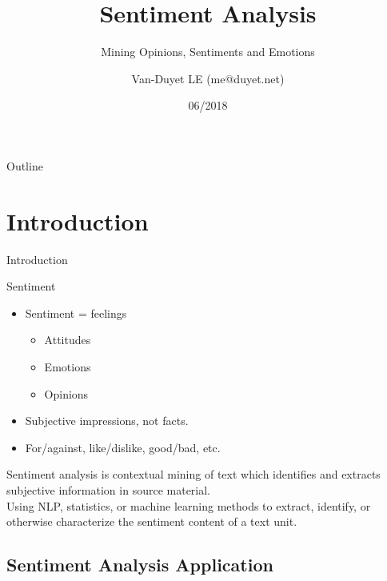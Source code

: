 \documentclass[xcolor=table]{beamer}
\title{Sentiment Analysis}
\subtitle{Mining Opinions, Sentiments and Emotions}
\author{Van-Duyet LE (me@duyet.net)}
\date{06/2018}
\begin{document}
\begin{frame}
  \titlepage
\end{frame}

\begin{frame}{Outline}
  \tableofcontents
\end{frame}

\section{Introduction}

\begin{frame}{Introduction}
    \begin{block}{Sentiment}
        \begin{itemize}
            \item Sentiment = feelings
            \begin{itemize}
                \item Attitudes
                \item Emotions
                \item Opinions
            \end{itemize}
            \item Subjective impressions, not facts.
            \item For/against, like/dislike, good/bad, etc.
        \end{itemize}
    \end{block}

    \pause
    \begin{block}{Sentiment analysis}
    is contextual mining of text which identifies and extracts subjective information in source material. \\
    Using NLP, statistics, or machine learning methods to extract, identify, or otherwise characterize the sentiment content of a text unit.
    \end{block}
\end{frame}

\subsection{Sentiment Analysis Application}
\end{document}
